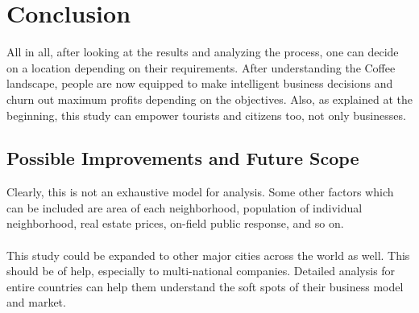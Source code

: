 \documentclass{article}
\begin{document}
\section{Conclusion}
{All in all, after looking at the results and analyzing the process, one can decide on a location depending on their requirements. After understanding the Coffee landscape, people are now equipped to make intelligent business decisions and churn out maximum profits depending on the objectives. Also, as explained at the beginning, this study can empower tourists and citizens too, not only businesses.}
\subsection{Possible Improvements and Future Scope}
{Clearly, this is not an exhaustive model for analysis. Some other factors which can be included are area of each neighborhood, population of individual neighborhood, real estate prices, on-field public response, and so on.}\\\\
{This study could be expanded to other major cities across the world as well. This should be of help, especially to multi-national companies. Detailed analysis for entire countries can help them understand the soft spots of their business model and market.}
\end{document}
